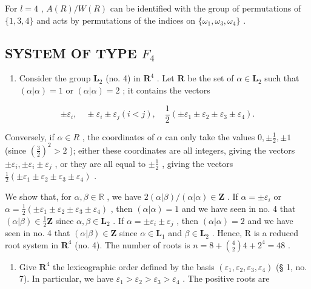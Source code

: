 For \(l = 4\) , \(A(R)/W(R)\) can be identified with the group of permutations of \(\{1,3,4\}\) and acts by permutations of the indices on \(\{\omega_1,\omega_3,\omega_4\}\) .

\subsection{\texorpdfstring{SYSTEM OF TYPE \(F_{4}\)}{SYSTEM OF TYPE F\_4}}

\begin{enumerate}
\def\labelenumi{(\Roman{enumi})}
\tightlist
\item
  Consider the group \(\mathbf{L}_2\) (no. 4) in \(\mathbf{R}^4\) . Let \(\mathbf{R}\) be the set of \(\alpha \in \mathbf{L}_2\) such that \((\alpha |\alpha) = 1\) or \((\alpha |\alpha) = 2\) ; it contains the vectors
\end{enumerate}

\[
\pm \varepsilon_ {i}, \quad \pm \varepsilon_ {i} \pm \varepsilon_ {j} (i <   j), \quad \frac {1}{2} (\pm \varepsilon_ {1} \pm \varepsilon_ {2} \pm \varepsilon_ {3} \pm \varepsilon_ {4}).
\]

Conversely, if \(\alpha\in R\) , the coordinates of \(\alpha\) can only take the values \(0,\pm\frac{1}{2},\pm1\) (since \((\frac{3}{2})^{2}>2\) ); either these coordinates are all integers, giving the vectors \(\pm\varepsilon_{i},\pm\varepsilon_{i}\pm\varepsilon_{j}\) , or they are all equal to \(\pm\frac{1}{2}\) , giving the vectors \(\frac{1}{2}(\pm\varepsilon_{1}\pm\varepsilon_{2}\pm\varepsilon_{3}\pm\varepsilon_{4})\) .

We show that, for \(\alpha, \beta \in \mathbb{R}\) , we have \(2(\alpha|\beta) / (\alpha|\alpha) \in \mathbf{Z}\) . If \(\alpha = \pm \varepsilon_i\) or \(\alpha = \frac{1}{2} (\pm \varepsilon_1 \pm \varepsilon_2 \pm \varepsilon_3 \pm \varepsilon_4)\) , then \((\alpha|\alpha) = 1\) and we have seen in no. 4 that \((\alpha|\beta) \in \frac{1}{2}\mathbf{Z}\) since \(\alpha, \beta \in \mathbf{L}_2\) . If \(\alpha = \pm \varepsilon_i \pm \varepsilon_j\) , then \((\alpha|\alpha) = 2\) and we have seen in no. 4 that \((\alpha|\beta) \in \mathbf{Z}\) since \(\alpha \in \mathbf{L}_1\) and \(\beta \in \mathbf{L}_2\) . Hence, R is a reduced root system in \(\mathbf{R}^4\) (no. 4). The number of roots is \(n = 8 + \binom{4}{2} 4 + 2^4 = 48\) .

\begin{enumerate}
\def\labelenumi{(\Roman{enumi})}
\setcounter{enumi}{1}
\tightlist
\item
  Give \(\mathbf{R}^4\) the lexicographic order defined by the basis \((\varepsilon_1, \varepsilon_2, \varepsilon_3, \varepsilon_4)\) (§ 1, no. 7). In particular, we have \(\varepsilon_1 > \varepsilon_2 > \varepsilon_3 > \varepsilon_4\) . The positive roots are
\end{enumerate}

